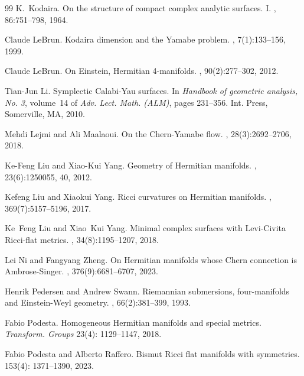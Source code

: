 \documentclass[12pt]{amsart}
\theoremstyle{plain}
\theoremstyle{definition}
\renewcommand{\>}{\rightarrow}
\numberwithin{equation}{section} %
\begin{document}
\begin{thebibliography}{99}
	K.~Kodaira.
	\newblock On the structure of compact complex analytic surfaces. {I}.
	, 86:751--798, 1964.
	
	Claude LeBrun.
	\newblock Kodaira dimension and the {Y}amabe problem.
	, 7(1):133--156, 1999.
	
	Claude LeBrun.
	\newblock On {E}instein, {H}ermitian 4-manifolds.
	, 90(2):277--302, 2012.
	
	Tian-Jun Li.
	\newblock Symplectic {C}alabi-{Y}au surfaces.
	\newblock In {\em Handbook of geometric analysis, {N}o. 3}, volume~14 of {\em
		Adv. Lect. Math. (ALM)}, pages 231--356. Int. Press, Somerville, MA, 2010.
	
	Mehdi Lejmi and Ali Maalaoui.
	\newblock On the {C}hern-{Y}amabe flow.
	, 28(3):2692--2706, 2018.
	
	Ke-Feng Liu and Xiao-Kui Yang.
	\newblock Geometry of {H}ermitian manifolds.
	, 23(6):1250055, 40, 2012.
	
	Kefeng Liu and Xiaokui Yang.
	\newblock Ricci curvatures on {H}ermitian manifolds.
	, 369(7):5157--5196, 2017.
	
	Ke~Feng Liu and Xiao~Kui Yang.
	\newblock Minimal complex surfaces with {L}evi-{C}ivita {R}icci-flat metrics.
	, 34(8):1195--1207, 2018.
	
	
	Lei Ni and Fangyang Zheng.
	\newblock On {H}ermitian manifolds whose {C}hern connection is
	{A}mbrose-{S}inger.
	, 376(9):6681--6707, 2023.
	
	Henrik Pedersen and Andrew Swann.
	\newblock Riemannian submersions, four-manifolds and {E}instein-{W}eyl
	geometry.
	, 66(2):381--399, 1993.
	
	 Fabio Podesta.  
	Homogeneous Hermitian manifolds and special metrics. \emph{Transform. Groups} 23(4): 1129--1147, 2018.
	
	 Fabio Podesta and Alberto Raffero.
\newblock	Bismut Ricci flat manifolds with symmetries. 
 153(4): 1371--1390, 2023.
	

\end{thebibliography}
\end{document}
